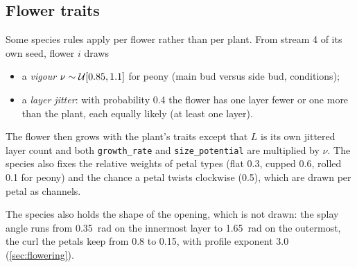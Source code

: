 \subsection{Flower traits}\label{sec:flowertraits}
Some species rules apply per flower rather than per plant. From stream 4 of its
own seed, flower $i$ draws
\begin{itemize}[leftmargin=*]
\item a \emph{vigour} $\nu \sim \mathcal{U}[0.85, 1.1]$ for peony (main bud versus
  side bud, conditions);
\item a \emph{layer jitter}: with probability 0.4 the flower has one layer
  fewer or one more than the plant, each equally likely (at least one layer).
\end{itemize}
The flower then grows with the plant's traits except that $L$ is its own
jittered layer count and both \texttt{growth\_rate} and \texttt{size\_potential}
are multiplied by $\nu$. The species also fixes the relative weights of petal
types (flat 0.3, cupped 0.6, rolled 0.1 for peony) and the chance a petal
twists clockwise (0.5), which are drawn per petal as channels.

The species also holds the shape of the opening, which is not drawn: the
splay angle runs from 0.35~rad on the innermost layer to 1.65~rad on the
outermost, the curl the petals keep from 0.8 to 0.15, with profile exponent
3.0 (\cref{sec:flowering}).

